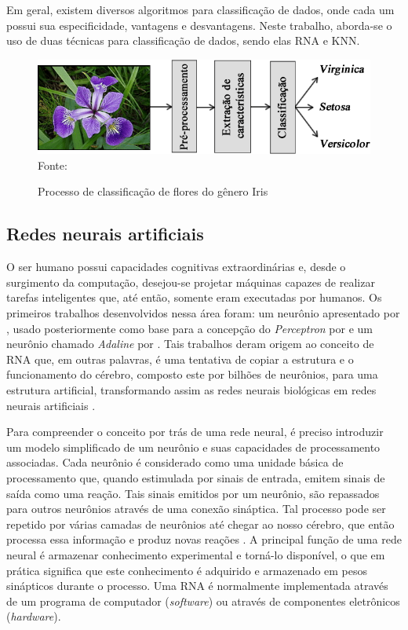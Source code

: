 Em geral, existem diversos algoritmos para classificação de dados, onde cada um possui sua especificidade, vantagens e desvantagens. Neste trabalho, aborda-se o uso de duas técnicas para classificação de dados, sendo elas RNA e KNN.

\begin{figure}[ht!]
\caption{Processo de classificação de flores do gênero Iris}
\label{fig:irisExample}
\centering
\includegraphics[scale=0.5]{img/irisExample.png}
{\fontsize{11pt}{\baselineskip}\selectfont
\\Fonte: \cite{pacheco2016agregaccao}
}
\end{figure}


\subsection{Redes neurais artificiais}
O ser humano possui capacidades cognitivas extraordinárias e, desde o surgimento da computação, desejou-se projetar máquinas capazes de realizar tarefas inteligentes que, até então, somente eram  executadas por humanos. Os primeiros trabalhos desenvolvidos nessa área foram: um neurônio apresentado por \cite{mcculloch1943logical}, usado posteriormente como base para a concepção do  \textit{Perceptron} por \cite{rosenblatt1958perceptron} e um neurônio chamado \textit{Adaline} por \cite{widrow1960adaptive}. Tais trabalhos deram origem ao conceito de RNA que, em outras palavras, é uma tentativa de copiar a estrutura e o funcionamento do cérebro, composto este por bilhões de neurônios, para uma estrutura artificial, transformando assim as redes neurais biológicas em redes neurais artificiais \citep{Rauber2005}.

Para compreender o conceito por trás de uma rede neural, é preciso introduzir um modelo simplificado de um neurônio e suas capacidades de processamento associadas. Cada neurônio é considerado como uma unidade básica de processamento que, quando estimulada por sinais de entrada, emitem sinais de saída como uma reação. Tais sinais emitidos por um neurônio, são repassados para outros neurônios através de uma conexão sináptica. Tal processo pode ser repetido por várias camadas de neurônios até chegar ao nosso cérebro, que então processa essa informação e produz novas reações \citep{baeza1999modern}. A principal função de uma rede neural é armazenar conhecimento experimental e torná-lo disponível, o que em prática significa que este conhecimento é adquirido e armazenado em pesos sinápticos durante o processo. Uma RNA é normalmente implementada através de um programa de computador (\textit{software}) ou através de componentes eletrônicos (\textit{hardware}).

